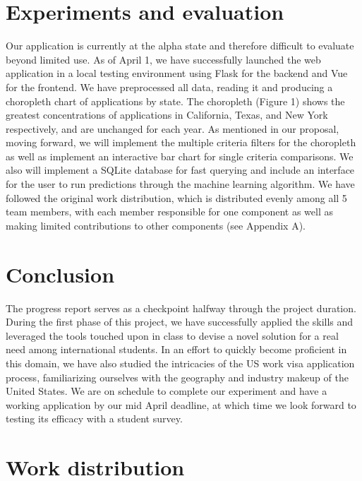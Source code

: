 \documentclass[sigconf]{acmart}
\begin{document}
\section{Experiments and evaluation}

Our application is currently at the alpha state and therefore difficult to evaluate beyond limited use. As of April 1, 
we have successfully launched the web application in a local testing environment using Flask for the backend and Vue for 
the frontend. We have preprocessed all data, reading it and producing a choropleth chart of applications by state. 
The choropleth (Figure 1) shows the greatest concentrations of applications in California, Texas, and New York respectively, 
and are unchanged for each year. 
As mentioned in our proposal, moving forward, we will implement the multiple criteria filters for the choropleth as well as 
implement an interactive bar chart for single criteria comparisons. We also will implement a SQLite database for fast querying 
and include an interface for the user to run predictions through the machine learning algorithm. We have followed the original 
work distribution, which is distributed evenly among all 5 team members, with each member responsible for one component as 
well as making limited contributions to other components (see Appendix A). 


\section{Conclusion}

The progress report serves as a checkpoint halfway through the project duration. During the first phase of this project, 
we have successfully applied the skills and leveraged the tools touched upon in class to devise a novel solution for a 
real need among international students. In an effort to quickly become proficient in this domain, we have also studied 
the intricacies of the US work visa application process, familiarizing ourselves with the geography and industry makeup 
of the United States. 
We are on schedule to complete our experiment and have a working application by our mid April deadline, at which time we 
look forward to testing its efficacy with a student survey. 



\appendix

\section{Work distribution}
\end{document}
